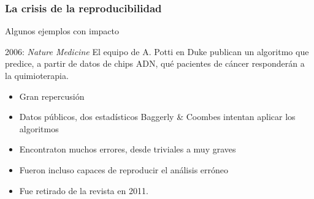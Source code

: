 \documentclass[9pt]{beamer}
\begin{document}
\begin{frame}
  \frametitle{La crisis de la reproducibilidad}
   Algunos ejemplos con impacto\\
  \begin{block}{2006: \textit{Nature Medicine}}
    El equipo de A. Potti en Duke publican un algoritmo que predice, a
    partir de datos de chips ADN, qué pacientes de cáncer responderán
    a la quimioterapia.
  \end{block}
      \begin{itemize}
      \item<3-> Gran repercusión
      \item<4-> Datos públicos, dos estadísticos Baggerly \& Coombes
        intentan aplicar los algoritmos
        
      \item<5-> Encontraton muchos errores, desde triviales a muy
        graves
      \item<6-> Fueron incluso capaces de reproducir el análisis
        erróneo
      \item<7-> Fue retirado de la revista en 2011.   
      \end{itemize}
\end{frame}
\end{document}
